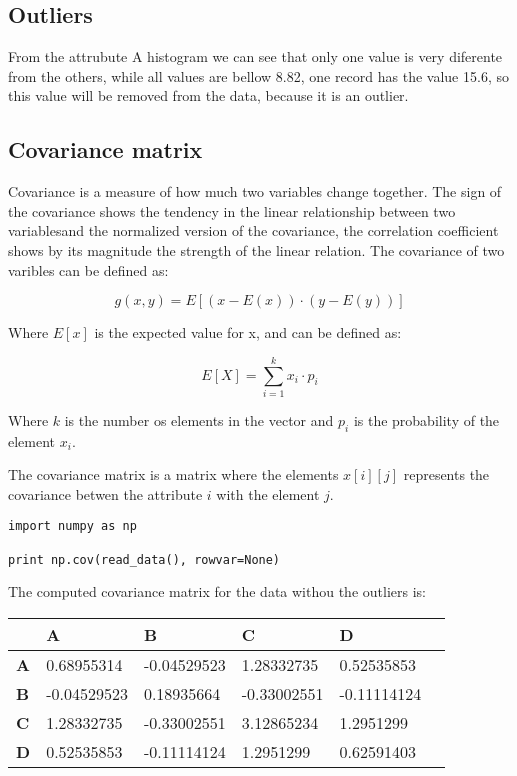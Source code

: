 \documentclass{article}
\begin{document}
\subsection{Outliers}
From the attrubute A histogram we can see that only one value is very diferente from the others, while all values are bellow 8.82, one record has the value 15.6, so this value will be removed from the data, because it is an outlier.
\newpage

\subsection{Covariance matrix}
Covariance is a measure of how much two variables change together.  The sign of the covariance shows the tendency in the linear relationship between two variablesand the normalized version of the covariance, the correlation coefficient shows by its magnitude the strength of the linear relation. The covariance of two varibles can be defined as:

\begin{equation}
    g(x,y) = E[(x - E(x)) \cdot (y - E(y))]
    \label{eq:conv_eq}
\end{equation}

Where $E[x]$ is the expected value for x, and can be defined as:

\begin{equation}
    E[X] = \sum_{i = 1}^{k} x_{i} \cdot p_{i}
    \label{eq:expec_val}
\end{equation}

Where $k$ is the number os elements in the vector and $p_{i}$ is the probability of the element $x_{i}$.

The covariance matrix is a matrix where the elements $x[i][j]$ represents the covariance betwen the attribute $i$  with the element $j$.

\begin{lstlisting}[frame=single]
import numpy as np

print np.cov(read_data(), rowvar=None)
\end{lstlisting}

The computed covariance matrix for the data withou the outliers is:
\begin{table}[h]
    \begin{tabular}{|l|l|l|l|l|l}
        \hline
        & \textbf{A} & \textbf{B} & \textbf{C} & \textbf{D}  \\ \hline
        \textbf{A} & 0.68955314  & -0.04529523  & 1.28332735  & 0.52535853   \\ \hline
        \textbf{B} & -0.04529523 &  0.18935664  & -0.33002551 & -0.11114124  \\ \hline
        \textbf{C} & 1.28332735  & -0.33002551  & 3.12865234  & 1.2951299    \\ \hline
        \textbf{D} & 0.52535853  & -0.11114124  & 1.2951299   & 0.62591403   \\ \hline
    \end{tabular}
\end{table}
\newpage
\end{document}
